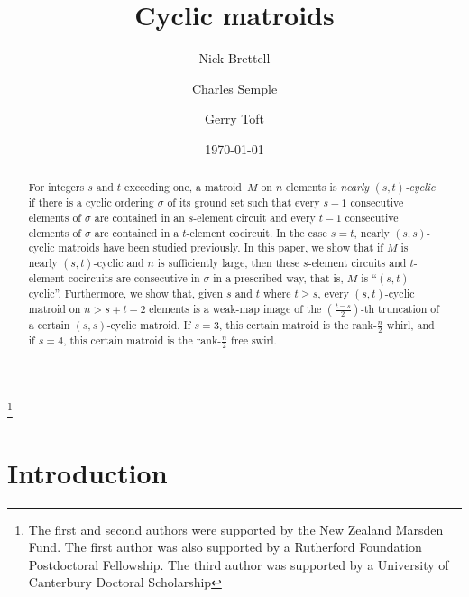 \documentclass[11pt]{amsart}
\begin{document}
\title{Cyclic matroids}

\thanks{The first and second authors were supported by the New Zealand Marsden Fund. The first author was also supported by a Rutherford Foundation Postdoctoral Fellowship.  The third author was supported by a University of Canterbury Doctoral Scholarship}

\author{Nick Brettell}
\address{School of Mathematics and Statistics, Victoria University of Wellington, Wellington, New Zealand}

\author{Charles Semple}
\address{School of Mathematics and Statistics, University of Canterbury, Christchurch, New Zealand}

\author{Gerry Toft}
\address{School of Mathematics and Statistics, University of Canterbury, Christchurch, New Zealand}



\date{\today}

\begin{abstract}
For integers $s$ and $t$ exceeding one, a matroid~$M$ on $n$ elements is {\em nearly $(s, t)$-cyclic} if there is a cyclic ordering $\sigma$ of its ground set such that every $s-1$ consecutive elements of $\sigma$ are contained in an $s$-element circuit and every $t-1$ consecutive elements of $\sigma$ are contained in a $t$-element cocircuit. In the case $s=t$, nearly $(s, s)$-cyclic matroids have been studied previously. In this paper, we show that if $M$ is nearly $(s, t)$-cyclic and $n$ is sufficiently large, then these $s$-element circuits and $t$-element cocircuits are consecutive in $\sigma$ in a prescribed way, that is, $M$ is ``$(s, t)$-cyclic''. Furthermore, we show that, given $s$ and $t$ where $t\ge s$, every $(s, t)$-cyclic matroid on $n > s+t-2$ elements is a weak-map image of the $\left(\frac{t-s}{2}\right)$-th truncation of a certain $(s, s)$-cyclic matroid. If $s=3$, this certain matroid is the rank-$\frac{n}{2}$ whirl, and if $s=4$, this certain matroid is the rank-$\frac{n}{2}$ free swirl.
\end{abstract}

\maketitle

\section{Introduction}
\end{document}

